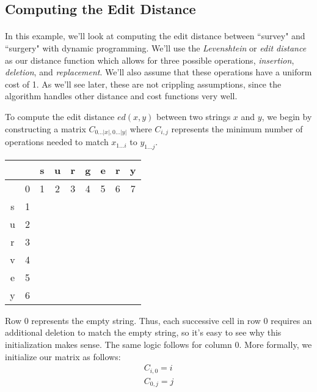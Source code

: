 \documentclass[10pt]{article}
\begin{document}
\subsection*{Computing the Edit Distance}

\paragraph{}In this example, we'll look at computing the edit distance between
``survey" and ``surgery" with dynamic programming. We'll use the
\textit{Levenshtein} or \textit{edit distance} as our distance function which
allows for three possible operations, \textit{insertion}, \textit{deletion},
and \textit{replacement}. We'll also assume that these operations have a
uniform cost of 1. As we'll see later, these are not crippling assumptions,
since the algorithm handles other distance and cost functions very well.

To compute the edit distance $ed(x, y)$ between two strings $x$ and
$y$, we begin by constructing a matrix $C_{0 \ldots |x|, 0 \ldots |y|}$ where
$C_{i, j}$ represents the minimum number of operations needed to match
$x_{1 \ldots i}$ to $y_{1 \ldots j}$.

\begin{center}
\begin{tabular}{c|c|c|c|c|c|c|c|c|}
  &   & s & u & r & g & e & r & y \\ \hline
  & 0 & 1 & 2 & 3 & 4 & 5 & 6 & 7 \\ \hline
s & 1 &   &   &   &   &   &   &   \\ \hline
u & 2 &   &   &   &   &   &   &   \\ \hline
r & 3 &   &   &   &   &   &   &   \\ \hline
v & 4 &   &   &   &   &   &   &   \\ \hline
e & 5 &   &   &   &   &   &   &   \\ \hline
y & 6 &   &   &   &   &   &   &   \\ \hline
\end{tabular}
\end{center}

Row 0 represents the empty string. Thus, each successive cell in row 0 requires
an additional deletion to match the empty string, so it's easy to see why this
initialization makes sense. The same logic follows for column 0. More formally,
we initialize our matrix as follows:
\begin{align*}
C_{i, 0} = i \\
C_{0, j} = j
\end{align*}
\end{document}
